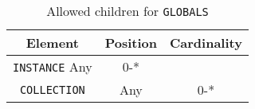 \begin{table}[!htbp]
\small
\centering
\begin{tabulary}{\linewidth}{|c |c |c|}
    \hline 
        \textbf{Element} &
        \textbf{Position} &
        \textbf{Cardinality}\\
    \hline      \hline  
        \texttt{INSTANCE}          
        Any &           
        0-*\\
    \hline    
        \texttt{COLLECTION} &           
        Any &           
        0-*\\
    \hline 
\end{tabulary}
     \caption{Allowed children for \texttt{GLOBALS}} 
     \label{tbl:globals-chilren}
 \end{table}
